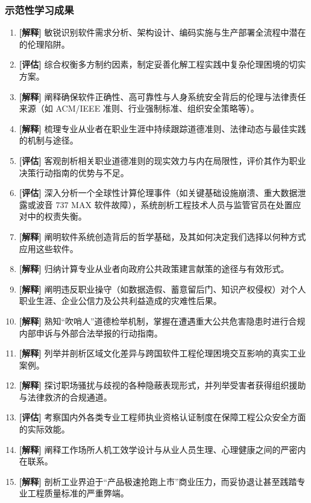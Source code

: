 \subsubsection{示范性学习成果}
\begin{enumerate}
    \item \textbf{[解释]} 敏锐识别软件需求分析、架构设计、编码实施与生产部署全流程中潜在的伦理陷阱。
    \item \textbf{[评估]} 综合权衡多方制约因素，制定妥善化解工程实践中复杂伦理困境的切实方案。
    \item \textbf{[解释]} 阐释确保软件正确性、高可靠性与人身系统安全背后的伦理与法律责任来源（如 ACM/IEEE 准则、行业强制标准、组织安全策略等）。
    \item \textbf{[解释]} 梳理专业从业者在职业生涯中持续跟踪道德准则、法律动态与最佳实践的机制与途径。
    \item \textbf{[评估]} 客观剖析相关职业道德准则的现实效力与内在局限性，评价其作为职业决策行动指南的优势与不足。
    \item \textbf{[评估]} 深入分析一个全球性计算伦理事件（如关键基础设施崩溃、重大数据泄露或波音 737 MAX 软件故障），系统剖析工程技术人员与监管官员在处置应对中的权责失衡。
    \item \textbf{[解释]} 阐明软件系统创造背后的哲学基础，及其如何决定我们选择以何种方式应用这些软件。
    \item \textbf{[解释]} 归纳计算专业从业者向政府公共政策建言献策的途径与有效形式。
    \item \textbf{[解释]} 阐明违反职业操守（如数据造假、蓄意留后门、知识产权侵权）对个人职业生涯、企业公信力及公共利益造成的灾难性后果。
    \item \textbf{[解释]} 熟知“吹哨人”道德检举机制，掌握在遭遇重大公共危害隐患时进行合规内部申诉与外部合法举报的行动指南。
    \item \textbf{[解释]} 列举并剖析区域文化差异与跨国软件工程伦理困境交互影响的真实工业案例。
    \item \textbf{[解释]} 探讨职场骚扰与歧视的各种隐蔽表现形式，并列举受害者获得组织援助与法律救济的合规通道。
    \item \textbf{[评估]} 考察国内外各类专业工程师执业资格认证制度在保障工程公众安全方面的实际效能。
    \item \textbf{[解释]} 阐释工作场所人机工效学设计与从业人员生理、心理健康之间的严密内在联系。
    \item \textbf{[解释]} 剖析工业界迫于“产品极速抢跑上市”商业压力，而妥协退让甚至践踏专业工程质量标准的严重弊端。
\end{enumerate}


